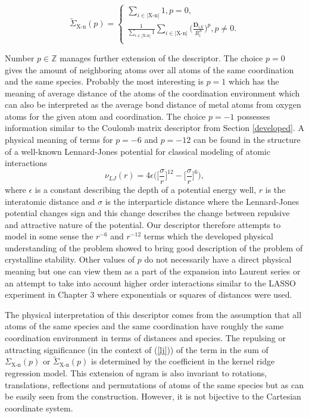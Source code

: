 \documentclass[11pt,oneside,czech,american]{book} %
\theoremstyle{definition} %
\theoremstyle{definition}
\begin{document}
\begin{equation}
	\tilde{\Sigma}_{\text{X-n}}(p) =
	\begin{cases}
		\sum_{i \in |\text{X-n}|} 1, p=0, \\
		\frac{1}{\sum_{i \in |\text{X-n}|}1}\sum_{i \in |\text{X-n}|} \Bigg(\frac{\bm{D}_{i X}}{R^S_i}\Bigg)^p, p \neq 0. \\
		
	\end{cases}
	\label{proposed}
\end{equation}

Number $p \in \mathbb{Z}$ manages further extension of the descriptor. The choice $p = 0$ gives the amount of neighboring atoms over all atoms of the same coordination and the same species.  Probably the most interesting is $p=1$ which has the meaning of average distance of the atoms of the coordination environment which can also be interpreted as the average bond distance of metal atoms from oxygen atoms for the given atom and coordination. The choice $p=-1$ possesses information similar to the Coulomb matrix descriptor from Section \ref{developed}. A physical meaning of terms for $p=-6$ and $p=-12$ can be found in the structure of a well-known Lennard-Jones potential for classical modeling of atomic interactions \parencite{wang20}
\begin{equation}
	\nu_{LJ}(r) = 4\epsilon \Bigg( \Big[ \frac{\sigma}{r} \Big]^{12} - \Big[ \frac{\sigma}{r} \Big]^6 \Bigg),
	\label{lj}
\end{equation}
where $\epsilon$ is a constant describing the depth of a potential energy well, $r$ is the interatomic distance and $\sigma$ is the interparticle distance where the Lennard-Jones potential changes sign and this change describes the change between repulsive and attractive nature of the potential. Our descriptor therefore attempts to model in some sense the $r^{-6}$ and $r^{-12}$ terms which the developed physical understanding of the problem showed to bring good description of the problem of crystalline stability.
Other values of $p$ do not necessarily have a direct physical meaning but one can view them as a part of the expansion into Laurent series or an attempt to take into account higher order interactions similar to the LASSO experiment in Chapter 3 where exponentials or squares of distances were used.

The physical interpretation of this descriptor comes from the assumption that all atoms of the same species and the same coordination have roughly the same coordination environment in terms of distances and species. The repulsing or attracting significance (in the context of (\ref{lj})) of the term in the sum of $\Sigma_{\text{X-n}}(p)$ or $\tilde{\Sigma}_{\text{X-n}}(p)$ is determined by the coefficient in the kernel ridge regression model. This extension of ngram is also invariant to rotations, translations, reflections and permutations of atoms of the same species but as can be easily seen from the construction. However, it is not bijective to the Cartesian coordinate system.
\end{document}
